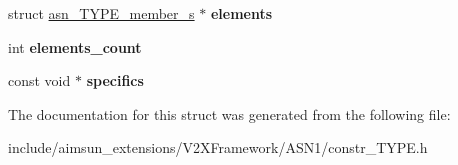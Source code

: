 \begin{DoxyCompactItemize}
\item 
struct \hyperlink{structasn__TYPE__member__s}{asn\+\_\+\+T\+Y\+P\+E\+\_\+member\+\_\+s} $\ast$ {\bfseries elements}\hypertarget{structasn__TYPE__descriptor__s_ad4b966ba4a3e7511b59933cf1d0b8200}{}\label{structasn__TYPE__descriptor__s_ad4b966ba4a3e7511b59933cf1d0b8200}

\item 
int {\bfseries elements\+\_\+count}\hypertarget{structasn__TYPE__descriptor__s_ac26bd7451f4f8b84cf30952c74e2ef0b}{}\label{structasn__TYPE__descriptor__s_ac26bd7451f4f8b84cf30952c74e2ef0b}

\item 
const void $\ast$ {\bfseries specifics}\hypertarget{structasn__TYPE__descriptor__s_a872c82d21e1ee31ba377d9ba31c6095d}{}\label{structasn__TYPE__descriptor__s_a872c82d21e1ee31ba377d9ba31c6095d}

\end{DoxyCompactItemize}


The documentation for this struct was generated from the following file\+:\begin{DoxyCompactItemize}
\item 
include/aimsun\+\_\+extensions/\+V2\+X\+Framework/\+A\+S\+N1/constr\+\_\+\+T\+Y\+P\+E.\+h\end{DoxyCompactItemize}
